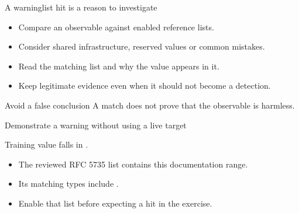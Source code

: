 \begin{frame}{A warninglist hit is a reason to investigate}
    \begin{itemize}
        \item Compare an observable against enabled reference lists.
        \item Consider shared infrastructure, reserved values or common mistakes.
        \item Read the matching list and why the value appears in it.
        \item Keep legitimate evidence even when it should not become a detection.
    \end{itemize}
    \begin{alertblock}{Avoid a false conclusion}
        A match does not prove that the observable is harmless.
    \end{alertblock}
\end{frame}

\begin{frame}{Demonstrate a warning without using a live target}
    \begin{block}{Training value}
         falls in .
    \end{block}
    \begin{itemize}
        \item The reviewed RFC 5735 list contains this documentation range.
        \item Its matching types include .
        \item Enable that list before expecting a hit in the exercise.
    \end{itemize}
\end{frame}

